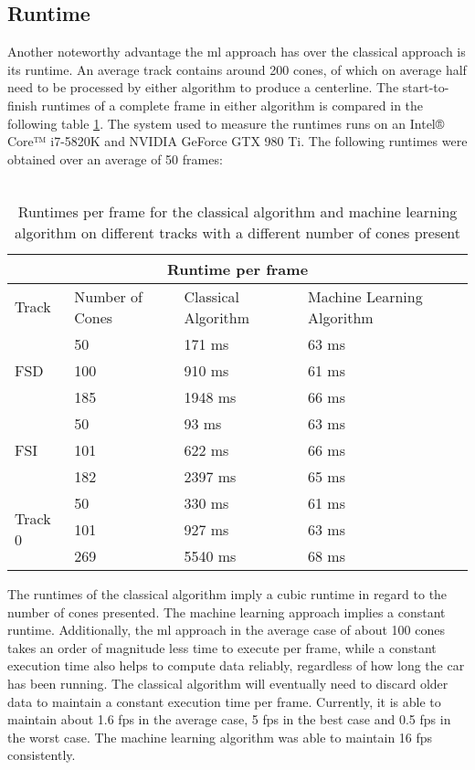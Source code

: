 \subsection{Runtime}
Another noteworthy advantage the \ac{ml} approach has over the classical approach is its runtime. An average track contains around 200 cones, of which on average half need to be processed by either algorithm to produce a centerline. The start-to-finish runtimes of a complete frame in either algorithm is compared in the following table \ref{table:2}. The system used to measure the runtimes runs on an Intel® Core™ i7-5820K and NVIDIA GeForce GTX 980 Ti. The following runtimes were obtained over an average of 50 frames:\\\\
\begin{table}[h!]
\centering
\begin{tabular}{ |p{1.5cm} p{3cm}||p{4cm}|p{5cm}|  }
    \hline
    \multicolumn{4}{|c|}{Runtime per frame} \\
    \hline
    Track  & Number of Cones  & Classical Algorithm & Machine Learning Algorithm\\
    \hline
    \hline

    \multirow{3}{*}{FSD} & 50  & 171 ms & 63 ms \\
                         & 100 & 910 ms & 61 ms\\
                         & 185 & 1948 ms & 66 ms\\ 
                         \hline
    \multirow{3}{*}{FSI} & 50  & 93 ms & 63 ms\\
                         & 101 & 622 ms & 66 ms\\
                         & 182 & 2397 ms & 65 ms\\ 
                         \hline
    \multirow{3}{*}{Track 0} & 50  & 330 ms & 61 ms\\
                             & 101 & 927 ms & 63 ms\\
                             & 269 & 5540 ms & 68 ms\\ 
                             \hline
   \end{tabular}
\caption{Runtimes per frame for the classical algorithm and machine learning algorithm on different tracks with a different number of cones present}
\label{table:2}
\end{table}
$ $\\
The runtimes of the classical algorithm imply a cubic runtime in regard to the number of cones presented. The machine learning approach implies a constant runtime. Additionally, the \ac{ml} approach in the average case of about 100 cones takes an order of magnitude less time to execute per frame, while a constant execution time also helps to compute data reliably, regardless of how long the car has been running. The classical algorithm will eventually need to discard older data to maintain a constant execution time per frame. Currently, it is able to maintain about 1.6 \ac{fps} in the average case, 5 \ac{fps} in the best case and 0.5 \ac{fps} in the worst case. The machine learning algorithm was able to maintain 16 \ac{fps} consistently. 